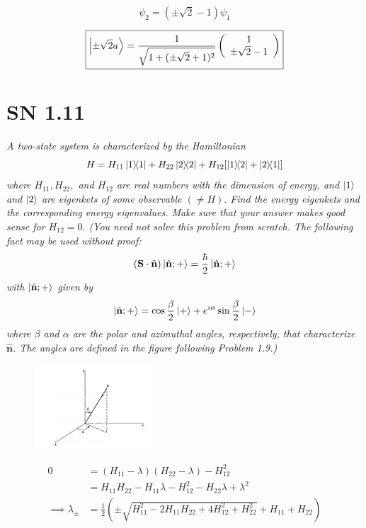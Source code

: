 \documentclass{article}
\begin{document}
\begin{equation*}
    \psi_2 = (\pm \sqrt{2} - 1) \psi_1
\end{equation*}

\begin{equation*}
    \boxed{\ket{\pm \sqrt{2} a} = \frac{1}{\sqrt{1+(\pm \sqrt{2}+1)^{2}}}\left(\begin{array}{c}
1 \\
\pm \sqrt{2}-1
\end{array}\right)}
\end{equation*}




\newpage

\section{SN 1.11}
\textit{A two-state system is characterized by the Hamiltonian
$$
H=H_{11}\ketbra{1}{1}+H_{22}\ketbra{2}{2}+H_{12}[\ketbra{1}{2}+\ketbra{2}{1}]
$$
where $H_{11}, H_{22},$ and $H_{12}$ are real numbers with the dimension of energy, and $\ket{1}$ and $\ket{2}$ are eigenkets of some observable $(\neq H) .$ Find the energy eigenkets and the corresponding energy eigenvalues. Make sure that your answer makes good sense for $H_{12}=0 .$ (You need not solve this problem from scratch. The following fact may be used without proof:
$$
(\mathbf{S} \cdot \hat{\mathbf{n}})\ket{\hat{\mathbf{n}} ;+}=\frac{\hbar}{2}\ket{\hat{\mathbf{n}} ;+}
$$
with $\ket{\hat{\mathbf{n}} ;+}$ given by
$$
\ket{\hat{\mathbf{n}} ;+}=\cos \frac{\beta}{2}\ket{+}+e^{i \alpha} \sin \frac{\beta}{2}\ket{-}
$$
where $\beta$ and $\alpha$ are the polar and azimuthal angles, respectively, that characterize $\hat{\mathbf{n}}$. The angles are defined in the figure following Problem 1.9.)}

\begin{figure}[H]
    \centering
    \includegraphics[width=0.4\textwidth]{figures/problem5.png}
    \label{fig:my_label}
\end{figure}


\begin{align*}
0&=\left(H_{11}-\lambda\right)\left(H_{22}-\lambda\right)-H_{12}^{2} \\
&=H_{11} H_{22}-H_{11} \lambda -H_{12}^2-H_{22} \lambda +\lambda ^2\\
\implies \lambda_\pm &= \frac{1}{2}\left(\pm\sqrt{H_{11}^2-2 H_{11} H_{22}+4 H_{12}^2+H_{22}^2}+H_{11}+H_{22}\right)
\end{align*}
\end{document}
